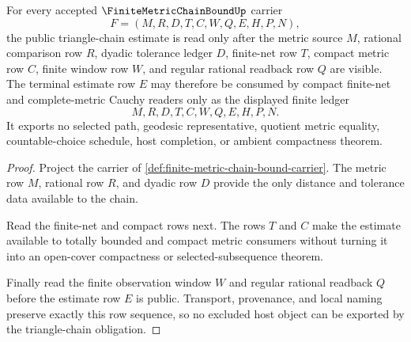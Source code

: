 \begin{theorem}
\label{thm:finite-metric-chain-bound-triangle-obligation}
For every accepted $\FiniteMetricChainBoundUp$ carrier
$$
F=(M,R,D,T,C,W,Q,E,H,P,N),
$$
the public triangle-chain estimate is read only after the metric source $M$, rational comparison row $R$, dyadic tolerance ledger $D$, finite-net row $T$, compact metric row $C$, finite window row $W$, and regular rational readback row $Q$ are visible. The terminal estimate row $E$ may therefore be consumed by compact finite-net and complete-metric Cauchy readers only as the displayed finite ledger
$$
M,R,D,T,C,W,Q,E,H,P,N .
$$
It exports no selected path, geodesic representative, quotient metric equality, countable-choice schedule, host completion, or ambient compactness theorem.
\end{theorem}
\begin{proof}
Project the carrier of \autoref{def:finite-metric-chain-bound-carrier}. The metric row $M$, rational row $R$, and dyadic row $D$ provide the only distance and tolerance data available to the chain.

Read the finite-net and compact rows next. The rows $T$ and $C$ make the estimate available to totally bounded and compact metric consumers without turning it into an open-cover compactness or selected-subsequence theorem.

Finally read the finite observation window $W$ and regular rational readback $Q$ before the estimate row $E$ is public. Transport, provenance, and local naming preserve exactly this row sequence, so no excluded host object can be exported by the triangle-chain obligation.
\end{proof}

